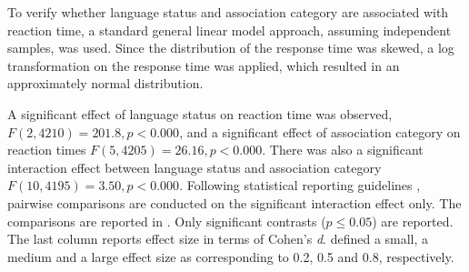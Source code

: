 \documentclass[output=paper,colorlinks,citecolor=brown,nonflat]{langsci/langscibook}
\begin{document}
To verify whether language status and association category are associated with reaction time, a standard general linear model approach, assuming independent samples, was used. Since the distribution of the response time was skewed, a log transformation on the response time was applied, which resulted in an approximately normal distribution.

A significant effect of language status on reaction time was observed, $F(2, 4210) = 201.8, p < 0.000$, and a significant effect of association category on reaction times $F(5, 4205) = 26.16, p < 0.000$. There was also a significant interaction effect between language status and association category $F(10, 4195) = 3.50, p < 0.000$. Following statistical reporting guidelines \citep{FieldEtAl2012}, pairwise comparisons are conducted on the significant interaction effect only. The comparisons are reported in . Only significant contrasts ($p \leq 0.05$) are reported. The last column reports effect size in terms of Cohen’s \textit{d}. \citet{Cohen1988} defined a small, a medium and a large effect size as corresponding to 0.2, 0.5 and 0.8, respectively.
\end{document}
